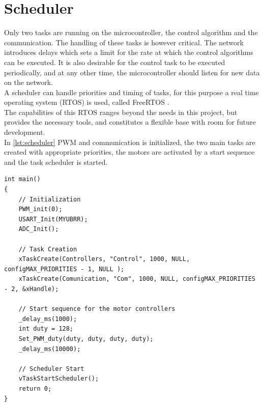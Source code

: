 \section{Scheduler}\label{sec:Scheduler}
Only two tasks are running on the microcontroller, the control algorithm and the communication. The handling of these tasks is however critical. The network introduces delays which sets a limit for the rate at which the control algorithms can be executed. It is also desirable for the control task to be executed periodically, and at any other time, the microcontroller should listen for new data on the network.\\
A scheduler can handle priorities and timing of tasks, for this purpose a real time operating system (RTOS) is used, called FreeRTOS \cite{freeRtos}.\\
The capabilities of this RTOS ranges beyond the needs in this project, but provides the necessary tools, and constitutes a flexible base with room for future development.\\
In \autoref{lst:scheduler} PWM and communication is initialized, the two main tasks are created with appropriate priorities, the motors are activated by a start sequence and the task scheduler is started.\\

\begin{lstlisting}[style=customcpp,
                    caption={Code for initialization, creation of the different tasks, start sequence for the motors and call to the scheduler.}, 
                    label=lst:scheduler]
int main()
{
    // Initialization
    PWM_init(0);
    USART_Init(MYUBRR);
    ADC_Init();
    
    // Task Creation
    xTaskCreate(Controllers, "Control", 1000, NULL, configMAX_PRIORITIES - 1, NULL );
    xTaskCreate(Comunication, "Com", 1000, NULL, configMAX_PRIORITIES - 2, &xHandle);
    
    // Start sequence for the motor controllers
    _delay_ms(1000);
    int duty = 128;
    Set_PWM_duty(duty, duty, duty, duty);
    _delay_ms(10000);
 
    // Scheduler Start
    vTaskStartScheduler();
    return 0;
}
\end{lstlisting}

